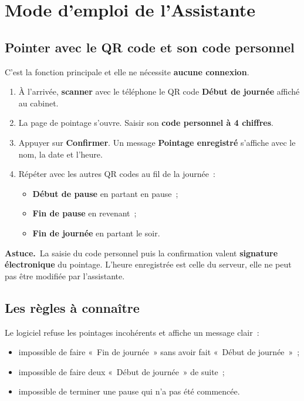 \documentclass[11pt,a4paper]{article}
\newcommand{\encadre}[2]{%
  \par\smallskip\noindent
  \colorbox{#1}{\parbox{\dimexpr\linewidth-2\fboxsep}{\smallskip #2\smallskip}}%
  \par\smallskip}
\newcommand{\astuce}[1]{\encadre{faradaylight}{\textbf{\textcolor{faraday}{Astuce.}}~#1}}
\newcommand{\menu}[1]{\textbf{\textcolor{faraday}{#1}}}
\begin{document}
\newpage

\section{Mode d'emploi de l'Assistante}

\subsection{Pointer avec le QR code et son code personnel}
C'est la fonction principale et elle ne nécessite \textbf{aucune connexion}.
\begin{enumerate}[leftmargin=1.6em]
  \item À l'arrivée, \textbf{scanner} avec le téléphone le QR code \menu{Début de journée} affiché au cabinet.
  \item La page de pointage s'ouvre. Saisir son \textbf{code personnel à 4 chiffres}.
  \item Appuyer sur \menu{Confirmer}. Un message \menu{Pointage enregistré} s'affiche avec le nom, la date et l'heure.
  \item Répéter avec les autres QR codes au fil de la journée~:
    \begin{itemize}[leftmargin=1.2em]
      \item \menu{Début de pause} en partant en pause~;
      \item \menu{Fin de pause} en revenant~;
      \item \menu{Fin de journée} en partant le soir.
    \end{itemize}
\end{enumerate}
\astuce{La saisie du code personnel puis la confirmation valent \textbf{signature électronique} du pointage. L'heure enregistrée est celle du serveur, elle ne peut pas être modifiée par l'assistante.}

\subsection{Les règles à connaître}
Le logiciel refuse les pointages incohérents et affiche un message clair~:
\begin{itemize}[leftmargin=1.4em]
  \item impossible de faire «~Fin de journée~» sans avoir fait «~Début de journée~»~;
  \item impossible de faire deux «~Début de journée~» de suite~;
  \item impossible de terminer une pause qui n'a pas été commencée.
\end{itemize}
\end{document}
